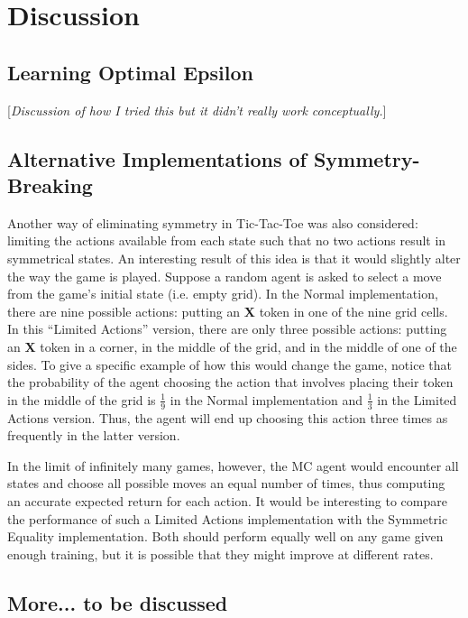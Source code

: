 \documentclass[11pt,a4paper]{report}
\begin{document}
\chapter{Discussion}

\section{Learning Optimal Epsilon}

[\emph{Discussion of how I tried this but it didn't really work conceptually.}]

\section{Alternative Implementations of Symmetry-Breaking}

Another way of eliminating symmetry in Tic-Tac-Toe was also considered: limiting the actions available from each state such that no two actions result in symmetrical states. An interesting result of this idea is that it would slightly alter the way the game is played. Suppose a random agent is asked to select a move from the game's initial state (i.e. empty grid). In the Normal implementation, there are nine possible actions: putting an \textbf{X} token in one of the nine grid cells. In this ``Limited Actions'' version, there are only three possible actions: putting an \textbf{X} token in a corner, in the middle of the grid, and in the middle of one of the sides. To give a specific example of how this would change the game, notice that the probability of the agent choosing the action that involves placing their token in the middle of the grid is $\frac{1}{9}$ in the Normal implementation and $\frac{1}{3}$ in the Limited Actions version. Thus, the agent will end up choosing this action three times as frequently in the latter version.

In the limit of infinitely many games, however, the MC agent would encounter all states and choose all possible moves an equal number of times, thus computing an accurate expected return for each action. It would be interesting to compare the performance of such a Limited Actions implementation with the Symmetric Equality implementation. Both should perform equally well on any game given enough training, but it is possible that they might improve at different rates.


\section{More... to be discussed}
\end{document}
